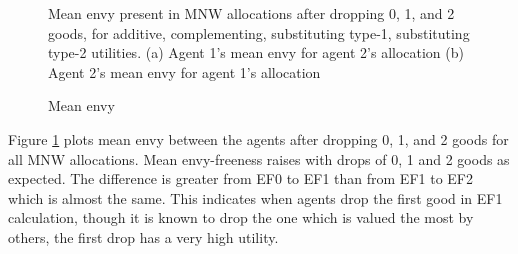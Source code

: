 \begin{figure}[h!]
\begin{subfigure}[b]{\linewidth}
    \caption{}
  \end{subfigure}
  \caption{Mean envy}
  \label{fig_efk_mean}
  \small
    Mean envy present in MNW allocations after dropping 0, 1, and 2 goods, for additive, complementing, substituting type-1, substituting type-2 utilities. (a) Agent 1's mean envy for agent 2's allocation (b) Agent 2's mean envy for agent 1's allocation
\end{figure}

Figure \ref{fig_efk_mean} plots mean envy between the agents after dropping 0, 1, and 2 goods for all MNW allocations. Mean envy-freeness raises with drops of 0, 1 and 2 goods as expected. The difference is greater from EF0 to EF1 than from EF1 to EF2 which is almost the same. This indicates when agents drop the first good in EF1 calculation, though it is known to drop the one which is valued the most by others, the first drop has a very high utility.


